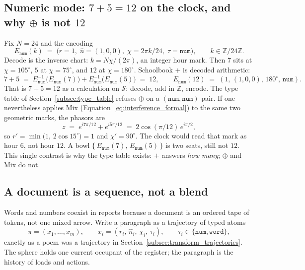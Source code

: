 \documentclass[12pt, a4paper]{article}
\begin{document}
\subsection{Numeric mode: $7+5=12$ on the clock, and why $\oplus$ is not $12$}
\label{subsec:clock_encoding}
Fix $N=24$ and the encoding
\begin{equation}
    E_{\mathtt{num}}(k)
    \;=\;
    \bigl(r=1,\;\hat n=(1,0,0),\;\chi=2\pi k/24,\;\tau=\mathtt{num}\bigr),
    \qquad
    k\in\mathbb{Z}/24\mathbb{Z}.
    \label{eq:clock_encoding}
\end{equation}
Decode is the inverse chart: $k = N\chi/(2\pi)$, an integer hour mark.
Then $7$ sits at $\chi=105^\circ$, $5$ at $\chi=75^\circ$, and $12$ at
$\chi=180^\circ$. Schoolbook $+$ is decoded arithmetic:
\begin{equation}
    7+5
    \;=\;
    E_{\mathtt{num}}^{-1}\bigl(E_{\mathtt{num}}(7)\bigr)
    +
    E_{\mathtt{num}}^{-1}\bigl(E_{\mathtt{num}}(5)\bigr)
    \;=\; 12,
    \qquad
    E_{\mathtt{num}}(12)
    \;=\;
    (1,\,(1,0,0),\,180^\circ,\,\mathtt{num}).
\end{equation}
That is $7+5=12$ as a calculation on $\mathcal{S}$: decode, add in
$\mathbb{Z}$, encode. The type table of
Section~\ref{subsec:type_table} refuses $\oplus$ on a
$(\mathtt{num},\mathtt{num})$ pair. If one nevertheless applies Mix
(Equation~\eqref{eq:interference_formal}) to the same two geometric
marks, the phasors are
\begin{equation}
    z
    \;=\;
    e^{i 7\pi/12} + e^{i 5\pi/12}
    \;=\;
    2\cos(\pi/12)\,e^{i\pi/2},
\end{equation}
so $r'=\min\bigl(1,\,2\cos 15^\circ\bigr)=1$ and $\chi'=90^\circ$.
The clock would read that mark as hour $6$, not hour $12$.
A bowl $\{\,E_{\mathtt{num}}(7),\,E_{\mathtt{num}}(5)\,\}$ is two seats,
still not $12$. This single contrast is why the type table exists:
$+$ answers \emph{how many}; $\oplus$ and Mix do not.

\subsection{A document is a sequence, not a blend}
\label{subsec:document_sequence}
Words and numbers coexist in reports because a document is an ordered
tape of tokens, not one mixed arrow. Write a paragraph as a trajectory
of typed atoms
\begin{equation}
    \pi = (x_1,\ldots,x_m),
    \qquad
    x_i=(r_i,\,\hat n_i,\,\chi_i,\,\tau_i),
    \qquad
    \tau_i\in\{\mathtt{num},\mathtt{word}\},
    \label{eq:mixed_document}
\end{equation}
exactly as a poem was a trajectory in
Section~\ref{subsec:transform_trajectories}. The sphere holds one
current occupant of the register; the paragraph is the history of
loads and actions.
\end{document}
